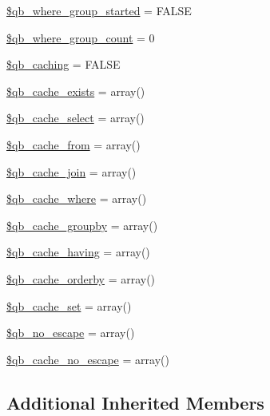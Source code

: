 \begin{DoxyCompactItemize}
\item 
\hyperlink{class_c_i___d_b__query__builder_aaae9d24ab424373f1bdbc1b601074433}{\$qb\+\_\+where\+\_\+group\+\_\+started} = F\+A\+L\+S\+E
\item 
\hyperlink{class_c_i___d_b__query__builder_a2fcbcc620115436314a2d25e7c9ce366}{\$qb\+\_\+where\+\_\+group\+\_\+count} = 0
\item 
\hyperlink{class_c_i___d_b__query__builder_aa1fb22248b06dc9b0b803ba19e54bcbd}{\$qb\+\_\+caching} = F\+A\+L\+S\+E
\item 
\hyperlink{class_c_i___d_b__query__builder_a895766ccda772ba2c14b755e5eed3615}{\$qb\+\_\+cache\+\_\+exists} = array()
\item 
\hyperlink{class_c_i___d_b__query__builder_a5fd3adf4f7eb7361b707c1172bd9581e}{\$qb\+\_\+cache\+\_\+select} = array()
\item 
\hyperlink{class_c_i___d_b__query__builder_a37229f5eb9d9d16137a76956d12c31a1}{\$qb\+\_\+cache\+\_\+from} = array()
\item 
\hyperlink{class_c_i___d_b__query__builder_ae4641bc6264db400498f5ed8e9ec683e}{\$qb\+\_\+cache\+\_\+join} = array()
\item 
\hyperlink{class_c_i___d_b__query__builder_ac325a253ad5ee9ac7fd5cbdad2603de3}{\$qb\+\_\+cache\+\_\+where} = array()
\item 
\hyperlink{class_c_i___d_b__query__builder_af74e5310be3853a3ed7a62666b9a8da3}{\$qb\+\_\+cache\+\_\+groupby} = array()
\item 
\hyperlink{class_c_i___d_b__query__builder_a37ceb9118d6a143e889dca4493a42cb2}{\$qb\+\_\+cache\+\_\+having} = array()
\item 
\hyperlink{class_c_i___d_b__query__builder_a0ff4129b83d9dd14b978c25d0a25a4d1}{\$qb\+\_\+cache\+\_\+orderby} = array()
\item 
\hyperlink{class_c_i___d_b__query__builder_a3f8cb0d781813dbc441265cfc1371a00}{\$qb\+\_\+cache\+\_\+set} = array()
\item 
\hyperlink{class_c_i___d_b__query__builder_a95b3a934937b47f5c90f381cf8a50860}{\$qb\+\_\+no\+\_\+escape} = array()
\item 
\hyperlink{class_c_i___d_b__query__builder_aab4ea89afea227fad65eec8dfb3844b3}{\$qb\+\_\+cache\+\_\+no\+\_\+escape} = array()
\end{DoxyCompactItemize}
\subsection*{Additional Inherited Members}


